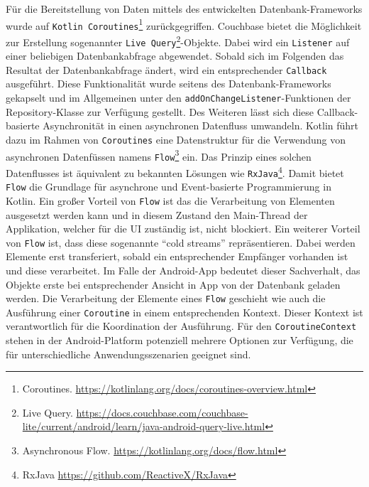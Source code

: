 Für die Bereitstellung von Daten mittels des entwickelten Datenbank-Frameworks wurde auf \texttt{Kotlin Coroutines}\footnote{Coroutines. \url{https://kotlinlang.org/docs/coroutines-overview.html}} zurückgegriffen. Couchbase bietet die Möglichkeit zur Erstellung sogenannter \texttt{Live Query}\footnote{Live Query. \newline \url{https://docs.couchbase.com/couchbase-lite/current/android/learn/java-android-query-live.html}}-Objekte. Dabei wird ein \texttt{Listener} auf einer beliebigen Datenbankabfrage abgewendet. Sobald sich im Folgenden das Resultat der Datenbankabfrage ändert, wird ein entsprechender \texttt{Callback} ausgeführt. Diese Funktionalität wurde seitens des Datenbank-Frameworks gekapselt und im Allgemeinen unter den \texttt{addOnChangeListener}-Funktionen der Repository-Klasse zur Verfügung gestellt. Des Weiteren lässt sich diese Callback-basierte Asynchronität in einen asynchronen Datenfluss umwandeln. Kotlin führt dazu im Rahmen von \texttt{Coroutines} eine Datenstruktur für die Verwendung von asynchronen Datenfüssen namens \texttt{Flow}\footnote{Asynchronous Flow. \url{https://kotlinlang.org/docs/flow.html}} ein. Das Prinzip eines solchen Datenflusses ist äquivalent zu bekannten Lösungen wie \texttt{RxJava}\footnote{RxJava \url{https://github.com/ReactiveX/RxJava}}. Damit bietet \texttt{Flow} die Grundlage für asynchrone und Event-basierte Programmierung in Kotlin. Ein großer Vorteil von \texttt{Flow} ist das die Verarbeitung von Elementen ausgesetzt werden kann und in diesem Zustand den Main-Thread der Applikation, welcher für die UI zuständig ist, nicht blockiert. Ein weiterer Vorteil von \texttt{Flow} ist, dass diese sogenannte \enquote{cold streams} repräsentieren. Dabei werden Elemente erst transferiert, sobald ein entsprechender Empfänger vorhanden ist und diese verarbeitet. Im Falle der Android-App bedeutet dieser Sachverhalt, das Objekte erste bei entsprechender Ansicht in App von der Datenbank geladen werden. Die Verarbeitung der Elemente eines \texttt{Flow} geschieht wie auch die Ausführung einer \texttt{Coroutine} in einem entsprechenden Kontext. Dieser Kontext ist verantwortlich für die Koordination der Ausführung. Für den \texttt{CoroutineContext} stehen in der Android-Platform potenziell mehrere Optionen zur Verfügung, die für unterschiedliche Anwendungsszenarien geeignet sind. 

